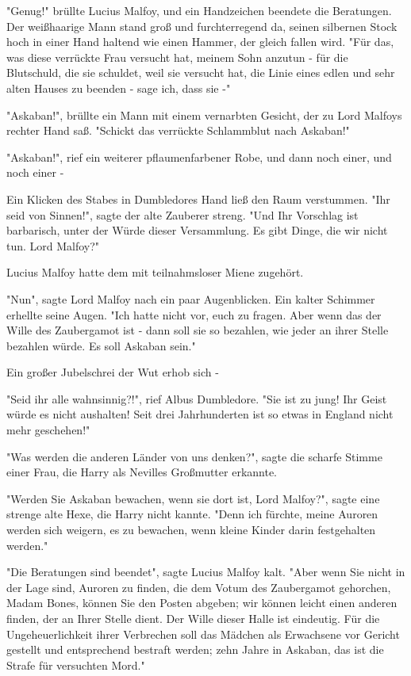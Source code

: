 {"Genug!" brüllte Lucius Malfoy, und ein Handzeichen beendete die Beratungen. Der weißhaarige Mann stand groß und furchterregend da, seinen silbernen Stock hoch in einer Hand haltend wie einen Hammer, der gleich fallen wird. "Für das, was diese verrückte Frau versucht hat, meinem Sohn anzutun - für die Blutschuld, die sie schuldet, weil sie versucht hat, die Linie eines edlen und sehr alten Hauses zu beenden - sage ich, dass sie -"

"Askaban!", brüllte ein Mann mit einem vernarbten Gesicht, der zu Lord Malfoys rechter Hand saß. "Schickt das verrückte Schlammblut nach Askaban!"

"Askaban!", rief ein weiterer pflaumenfarbener Robe, und dann noch einer, und noch einer -

Ein Klicken des Stabes in Dumbledores Hand ließ den Raum verstummen. "Ihr seid von Sinnen!", sagte der alte Zauberer streng. "Und Ihr Vorschlag ist barbarisch, unter der Würde dieser Versammlung. Es gibt Dinge, die wir nicht tun. Lord Malfoy?"

Lucius Malfoy hatte dem mit teilnahmsloser Miene zugehört.

"Nun", sagte Lord Malfoy nach ein paar Augenblicken. Ein kalter Schimmer erhellte seine Augen. "Ich hatte nicht vor, euch zu fragen. Aber wenn das der Wille des Zaubergamot ist - dann soll sie so bezahlen, wie jeder an ihrer Stelle bezahlen würde. Es soll Askaban sein."

Ein großer Jubelschrei der Wut erhob sich -

"Seid ihr alle wahnsinnig?!", rief Albus Dumbledore. "Sie ist zu jung! Ihr Geist würde es nicht aushalten! Seit drei Jahrhunderten ist so etwas in England nicht mehr geschehen!"

"Was werden die anderen Länder von uns denken?", sagte die scharfe Stimme einer Frau, die Harry als Nevilles Großmutter erkannte.

"Werden Sie Askaban bewachen, wenn sie dort ist, Lord Malfoy?", sagte eine strenge alte Hexe, die Harry nicht kannte. "Denn ich fürchte, meine Auroren werden sich weigern, es zu bewachen, wenn kleine Kinder darin festgehalten werden."

"Die Beratungen sind beendet", sagte Lucius Malfoy kalt. "Aber wenn Sie nicht in der Lage sind, Auroren zu finden, die dem Votum des Zaubergamot gehorchen, Madam Bones, können Sie den Posten abgeben; wir können leicht einen anderen finden, der an Ihrer Stelle dient. Der Wille dieser Halle ist eindeutig. Für die Ungeheuerlichkeit ihrer Verbrechen soll das Mädchen als Erwachsene vor Gericht gestellt und entsprechend bestraft werden; zehn Jahre in Askaban, das ist die Strafe für versuchten Mord."

}
